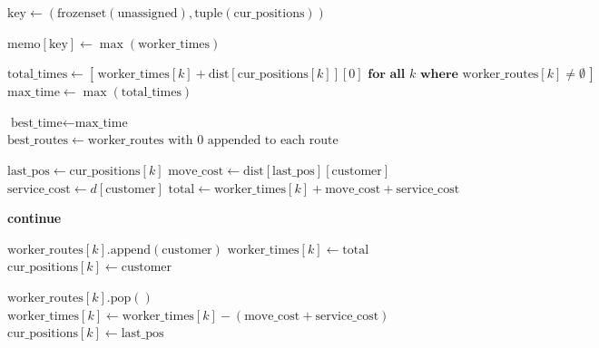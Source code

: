 \documentclass[11pt]{article}
\begin{document}
\begin{algorithm}[H]
\caption{\textbf{Branch \& Bound Algorithm}}
\begin{algorithmic}[1]
    
    \State $\text{key} \gets (\text{frozenset}(\text{unassigned}), \text{tuple}(\text{cur\_positions}))$
    
        \State \Return
    \EndIf
    \State $\text{memo}[\text{key}] \gets \max(\text{worker\_times})$
    \medskip

        \State $\text{total\_times} \gets [\,\text{worker\_times}[k] + \text{dist}[\text{cur\_positions}[k]][0] \textbf{ for all } k \textbf{ where } \text{worker\_routes}[k] \neq \emptyset\,]$
        \State $\text{max\_time} \gets \max(\text{total\_times})$
        
            \State $\text{best\_time} \gets \text{max\_time} $
            \State $\text{best\_routes} \gets \text{worker\_routes with } 0 \text{ appended to each route}$
        \EndIf
        \State \Return
    \EndIf
    \medskip

            \State $\text{last\_pos} \gets \text{cur\_positions}[k]$
            \State $\text{move\_cost} \gets \text{dist}[\text{last\_pos}][\text{customer}]$
            \State $\text{service\_cost} \gets d[\text{customer}]$
            \State $\text{total} \gets \text{worker\_times}[k] + \text{move\_cost} + \text{service\_cost}$
            \medskip
            
                \State \textbf{continue}
            \EndIf
            \medskip

            \State $\text{worker\_routes}[k].\text{append}(\text{customer})$
            \State $\text{worker\_times}[k] \gets \text{total}$
            \State $\text{cur\_positions}[k] \gets \text{customer}$
            \medskip
            
            \State {}
            \medskip
            
            \State $\text{worker\_routes}[k].\text{pop}()$
            \State $\text{worker\_times}[k] \gets \text{worker\_times}[k] - (\text{move\_cost} + \text{service\_cost})$
            \State $\text{cur\_positions}[k] \gets \text{last\_pos}$
        \EndFor
    \EndFor
\EndFunction
\end{algorithmic}
\end{algorithm}
\end{document}

